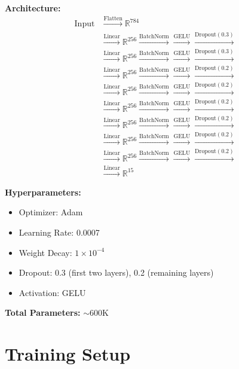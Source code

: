 \documentclass[11pt]{article}
\begin{document}
\textbf{Architecture:}
\begin{align*}
\text{Input} &\xrightarrow{\text{Flatten}} \mathbb{R}^{784} \\
&\xrightarrow{\text{Linear}} \mathbb{R}^{256} \xrightarrow{\text{BatchNorm}} \xrightarrow{\text{GELU}} \xrightarrow{\text{Dropout}(0.3)} \\
&\xrightarrow{\text{Linear}} \mathbb{R}^{256} \xrightarrow{\text{BatchNorm}} \xrightarrow{\text{GELU}} \xrightarrow{\text{Dropout}(0.3)} \\
&\xrightarrow{\text{Linear}} \mathbb{R}^{256} \xrightarrow{\text{BatchNorm}} \xrightarrow{\text{GELU}} \xrightarrow{\text{Dropout}(0.2)} \\
&\xrightarrow{\text{Linear}} \mathbb{R}^{256} \xrightarrow{\text{BatchNorm}} \xrightarrow{\text{GELU}} \xrightarrow{\text{Dropout}(0.2)} \\
&\xrightarrow{\text{Linear}} \mathbb{R}^{256} \xrightarrow{\text{BatchNorm}} \xrightarrow{\text{GELU}} \xrightarrow{\text{Dropout}(0.2)} \\
&\xrightarrow{\text{Linear}} \mathbb{R}^{256} \xrightarrow{\text{BatchNorm}} \xrightarrow{\text{GELU}} \xrightarrow{\text{Dropout}(0.2)} \\
&\xrightarrow{\text{Linear}} \mathbb{R}^{256} \xrightarrow{\text{BatchNorm}} \xrightarrow{\text{GELU}} \xrightarrow{\text{Dropout}(0.2)} \\
&\xrightarrow{\text{Linear}} \mathbb{R}^{256} \xrightarrow{\text{BatchNorm}} \xrightarrow{\text{GELU}} \xrightarrow{\text{Dropout}(0.2)} \\
&\xrightarrow{\text{Linear}} \mathbb{R}^{15}
\end{align*}

\textbf{Hyperparameters:}
\begin{itemize}
    \item Optimizer: Adam
    \item Learning Rate: 0.0007
    \item Weight Decay: $1 \times 10^{-4}$
    \item Dropout: 0.3 (first two layers), 0.2 (remaining layers)
    \item Activation: GELU
\end{itemize}

\textbf{Total Parameters:} $\sim$600K

\section{Training Setup}
\end{document}
